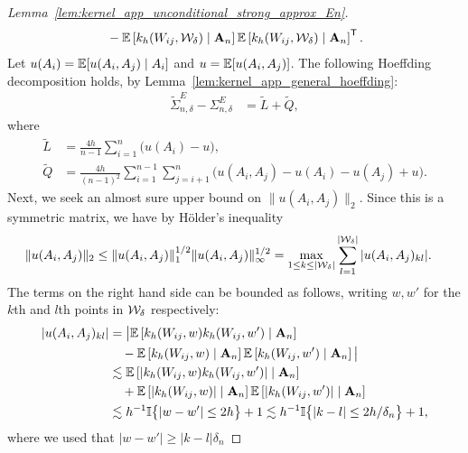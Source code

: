 \begin{proof}[Lemma~\ref{lem:kernel_app_unconditional_strong_approx_En}]
\begin{align*}
    &\quad-
    \mathbb{E}\left[
      k_h(W_{i j}, \mathcal{W}_\delta)
      \mid \mathbf{A}_n
    \right]
    \mathbb{E}\left[
      k_h(W_{i j}, \mathcal{W}_\delta)
      \mid \mathbf{A}_n
    \right]^{\mathsf{T}}.
  \end{align*}
  Let $u(A_i) = \mathbb{E}[u(A_i, A_j) \mid A_i]$ and
  $u = \mathbb{E}[u(A_i, A_j)]$.
  The following Hoeffding decomposition holds,
  by Lemma~\ref{lem:kernel_app_general_hoeffding}:
  \begin{align*}
    \tilde \Sigma^E_{n,\delta} - \Sigma^E_{n,\delta}
    &=
    \tilde L +\tilde Q,
  \end{align*}
  where
  \begin{align*}
    \tilde L
    &=
    \frac{4h}{n-1}
    \sum_{i=1}^n
    \big(
      u(A_i) - u
    \big), \\
    \tilde Q
    &=
    \frac{4h}{(n-1)^2}
    \sum_{i=1}^{n-1}
    \sum_{j=i+1}^{n}
    \big(
      u(A_i, A_j) - u(A_i) - u(A_j) + u
    \big).
  \end{align*}
  Next, we seek an almost sure upper bound on
  $\|u(A_i, A_j)\|_2$.
  Since this is a symmetric matrix,
  we have by H{\"o}lder's inequality
  \begin{align*}
    \|u(A_i, A_j)\|_2
    &\leq
    \|u(A_i, A_j)\|_1^{1/2}
    \|u(A_i, A_j)\|_\infty^{1/2}
    =
    \max_{1 \leq k \leq |\mathcal{W}_\delta|}
    \sum_{l=1}^{|\mathcal{W}_\delta|}
    |u(A_i, A_j)_{kl}|.
  \end{align*}
  The terms on the right hand side can be bounded as follows,
  writing $w, w'$ for the $k$th and $l$th
  points in $\mathcal{W}_\delta$ respectively:
  \begin{align*}
    |u(A_i, A_j)_{kl}|
    &=
    \big|
    \mathbb{E}\left[
      k_h(W_{i j}, w)
      k_h(W_{i j}, w')
      \mid \mathbf{A}_n
    \right] \\
    &\quad-
    \mathbb{E}\left[
      k_h(W_{i j}, w)
      \mid \mathbf{A}_n
    \right]
    \mathbb{E}\left[
      k_h(W_{i j}, w')
      \mid \mathbf{A}_n
    \right]
    \big| \\
    &\lesssim
    \mathbb{E}\left[
      |
      k_h(W_{i j}, w)
      k_h(W_{i j}, w')
      |
      \mid \mathbf{A}_n
    \right] \\
    &\quad+
    \mathbb{E}\left[
      |
      k_h(W_{i j}, w)
      |
      \mid \mathbf{A}_n
    \right]
    \mathbb{E}\left[
      |
      k_h(W_{i j}, w')
      |
      \mid \mathbf{A}_n
    \right] \\
    &\lesssim
    h^{-1}
    \mathbb{I}\big\{ |w-w'| \leq 2h \big\}
    + 1
    \lesssim
    h^{-1}
    \mathbb{I}\big\{ |k-l| \leq 2h/\delta_n \big\}
    + 1,
  \end{align*}
  where we used that
  $|w-w'| \geq |k-l| \delta_n$

\end{proof}

